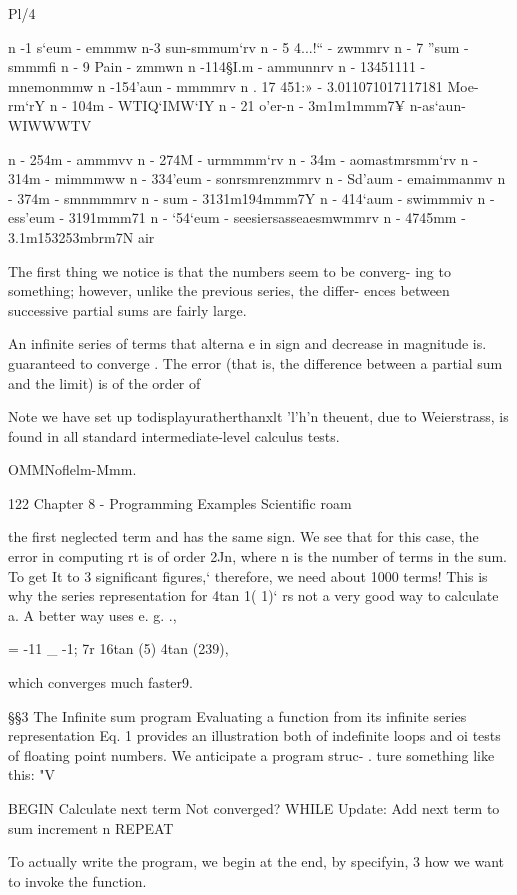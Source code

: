 Pl/4

n -1 s‘eum - emmmw
n-3 sun-smmum‘rv
n - 5 4...!“ - zwmmrv
n - 7 ”sum - smmmfi
n - 9 Pain - zmmwn
n -114§I.m - ammunnrv
n - 13451111 - mnemonmmw
n -154'aun - mmmmrv
n . 17 451:» - 3.011071017117181 Moe-rm‘rY
n - 104m - WTIQ‘IMW‘IY
n - 21 o'er-n - 3m1m1mmm7¥
n-as‘aun-WIWWWTV

n - 254m - ammmvv
n - 274M - urmmmm‘rv
n - 34m - aomastmrsmm‘rv
n - 314m - mimmmww
n - 334'eum - sonrsmrenzmmrv
n - Sd'aum - emaimmanmv
n - 374m - smnmmmrv
n - sum - 3131m194mmm7Y
n - 414‘aum - swimmmiv
n - ess'eum - 3191mmm71
n - ‘54‘eum - seesiersasseaesmwmmrv
n - 4745mm - 3.1m153253mbrm7N air

The first thing we notice is that the numbers seem to be converg-
ing to something; however, unlike the previous series, the differ-
ences between successive partial sums are fairly large.

An infinite series of terms that alterna e in sign and decrease in
magnitude is. guaranteed to converge . The error (that is, the
difference between a partial sum and the limit) is of the order of

 

Note we have set up todisplayuratherthanxlt
'l'h'n theuent, due to Weierstrass, is found in all standard intermediate-level calculus tests.

OMMNoflelm-Mmm.

122 Chapter 8 - Programming Examples Scientific roam

the first neglected term and has the same sign. We see that for
this case, the error in computing rt is of order 2Jn, where n is the
number of terms in the sum. To get It to 3 significant figures,‘
therefore, we need about 1000 terms! This is why the series
representation for 4tan 1( 1)‘ rs not a very good way to calculate a.
A better way uses e. g. .,

= -11 _ -1;
7r 16tan (5) 4tan (239),

which converges much faster9.

§§3 The Infinite sum program
Evaluating a function from its infinite series representation
Eq. 1 provides an illustration both of indefinite loops and oi
tests of floating point numbers. We anticipate a program struc- .
ture something like this: "V

 

BEGIN
Calculate next term
Not converged?
WHILE
Update:
Add next term to sum
increment n
REPEAT

To actually write the program, we begin at the end, by specifyin, 3
how we want to invoke the function.

